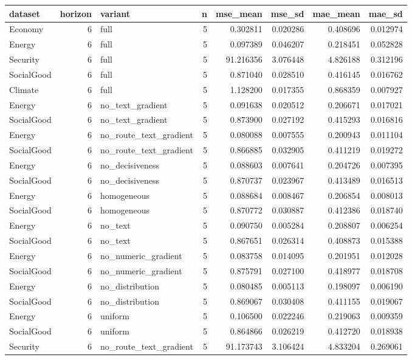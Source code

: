 \begin{tabular}{lrlrrrrr}
\toprule
dataset & horizon & variant & n & mse\_mean & mse\_sd & mae\_mean & mae\_sd \\
\midrule
Economy & 6 & full & 5 & 0.302811 & 0.020286 & 0.408696 & 0.012974 \\
Energy & 6 & full & 5 & 0.097389 & 0.046207 & 0.218451 & 0.052828 \\
Security & 6 & full & 5 & 91.216356 & 3.076448 & 4.826188 & 0.312196 \\
SocialGood & 6 & full & 5 & 0.871040 & 0.028510 & 0.416145 & 0.016762 \\
Climate & 6 & full & 5 & 1.128200 & 0.017355 & 0.868359 & 0.007927 \\
Energy & 6 & no\_text\_gradient & 5 & 0.091638 & 0.020512 & 0.206671 & 0.017021 \\
SocialGood & 6 & no\_text\_gradient & 5 & 0.873900 & 0.027192 & 0.415293 & 0.016816 \\
Energy & 6 & no\_route\_text\_gradient & 5 & 0.080088 & 0.007555 & 0.200943 & 0.011104 \\
SocialGood & 6 & no\_route\_text\_gradient & 5 & 0.866885 & 0.032905 & 0.411219 & 0.019272 \\
Energy & 6 & no\_decisiveness & 5 & 0.088603 & 0.007641 & 0.204726 & 0.007395 \\
SocialGood & 6 & no\_decisiveness & 5 & 0.870737 & 0.023967 & 0.413489 & 0.016513 \\
Energy & 6 & homogeneous & 5 & 0.088684 & 0.008467 & 0.206854 & 0.008013 \\
SocialGood & 6 & homogeneous & 5 & 0.870772 & 0.030887 & 0.412386 & 0.018740 \\
Energy & 6 & no\_text & 5 & 0.090750 & 0.005284 & 0.208807 & 0.006254 \\
SocialGood & 6 & no\_text & 5 & 0.867651 & 0.026314 & 0.408873 & 0.015388 \\
Energy & 6 & no\_numeric\_gradient & 5 & 0.083758 & 0.014095 & 0.201951 & 0.012028 \\
SocialGood & 6 & no\_numeric\_gradient & 5 & 0.875791 & 0.027100 & 0.418977 & 0.018708 \\
Energy & 6 & no\_distribution & 5 & 0.080485 & 0.005113 & 0.198097 & 0.006190 \\
SocialGood & 6 & no\_distribution & 5 & 0.869067 & 0.030408 & 0.411155 & 0.019067 \\
Energy & 6 & uniform & 5 & 0.106500 & 0.022246 & 0.219063 & 0.009359 \\
SocialGood & 6 & uniform & 5 & 0.864866 & 0.026219 & 0.412720 & 0.018938 \\
Security & 6 & no\_route\_text\_gradient & 5 & 91.173743 & 3.106424 & 4.833204 & 0.269061 \\
\bottomrule
\end{tabular}
